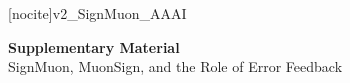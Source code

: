 

\usepackage{xr}
[nocite]{v2_SignMuon_AAAI}


\onecolumn

\begin{center}
  {\Large\bf Supplementary Material}\\[4pt]
  {\large SignMuon, MuonSign, and the Role of Error Feedback}
\end{center}
\vspace{1.5em}

\renewcommand{\thefigure}{A\arabic{figure}}
\renewcommand{\thetable}{A\arabic{table}}
\renewcommand{\thealgorithm}{A\arabic{algorithm}}
\setcounter{figure}{0}
\setcounter{table}{0}
\setcounter{algorithm}{0}






